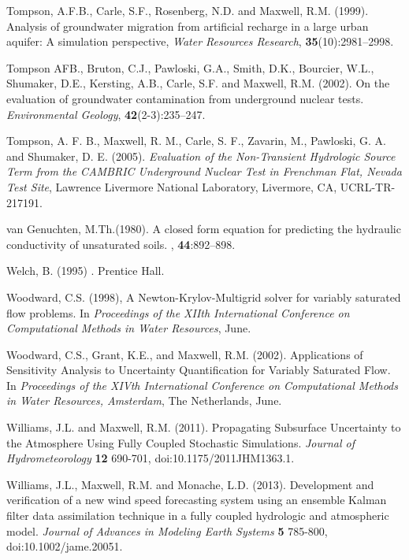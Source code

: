 \begin{thebibliography}{999}
  Tompson, A.F.B., Carle, S.F., Rosenberg, N.D. and Maxwell, R.M.
 (1999). Analysis of groundwater migration from artificial recharge in a large
 urban aquifer: A simulation perspective, {\em Water Resources
Research}, {\bf 35}(10):2981--2998.

Tompson AFB., Bruton, C.J., Pawloski, G.A., Smith, D.K., Bourcier, W.L., Shumaker, D.E., Kersting, A.B., Carle, S.F. and Maxwell, R.M. (2002). On the evaluation of groundwater contamination from underground nuclear tests.  {\em Environmental Geology}, {\bf 42}(2-3):235--247.

Tompson, A. F. B., Maxwell, R. M., Carle, S. F., Zavarin, M., Pawloski, G. A. and Shumaker, D. E. (2005). {\em Evaluation of the Non-Transient Hydrologic Source Term from the CAMBRIC Underground Nuclear Test in Frenchman Flat, Nevada Test Site}, Lawrence Livermore National Laboratory, Livermore, CA, UCRL-TR-217191.

{van Genuchten}, M.Th.(1980).
\newblock A closed form equation for predicting the hydraulic conductivity of
  unsaturated soils.
, {\bf 44}:892--898.

Welch, B. (1995)
.
\newblock Prentice Hall.

Woodward, C.S. (1998),
\newblock A {N}ewton-{K}rylov-{M}ultigrid solver for variably saturated flow
  problems.
\newblock In {\em Proceedings of the XIIth International Conference on
  Computational Methods in Water Resources}, June.

Woodward, C.S., Grant,  K.E., and Maxwell, R.M. (2002). Applications of Sensitivity Analysis to Uncertainty Quantification for Variably Saturated Flow.
\newblock In {\em Proceedings of the XIVth International Conference on Computational Methods in Water Resources, Amsterdam}, The Netherlands, June.

Williams, J.L. and Maxwell, R.M. (2011). Propagating Subsurface Uncertainty to the Atmosphere Using Fully Coupled Stochastic Simulations. {\em Journal of Hydrometeorology} {\bf 12} 690-701, doi:10.1175/2011JHM1363.1.

Williams, J.L., Maxwell, R.M. and Monache, L.D. (2013). Development and verification of a new wind speed forecasting system using an ensemble Kalman filter data assimilation technique in a fully coupled hydrologic and atmospheric model. {\em Journal of Advances in Modeling Earth Systems} {\bf 5} 785-800, doi:10.1002/jame.20051.


\end{thebibliography}

